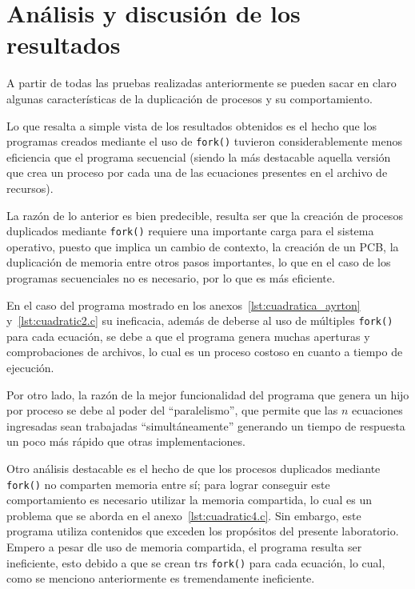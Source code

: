 \section{Análisis y discusión de los resultados}
A partir de todas las pruebas realizadas anteriormente se pueden sacar en claro algunas características de la duplicación de procesos y su comportamiento.

Lo que resalta a simple vista de los resultados obtenidos es el hecho que los programas creados mediante el uso de \verb|fork()| tuvieron considerablemente menos eficiencia que el programa secuencial (siendo la más destacable aquella versión que crea un proceso por cada una de las ecuaciones presentes en el archivo de recursos).

La razón de lo anterior es bien predecible, resulta ser que la creación de procesos duplicados mediante \verb|fork()| requiere una importante carga para el sistema operativo, puesto que implica un cambio de contexto, la creación de un PCB, la duplicación de memoria entre otros pasos importantes, lo que en el caso de los programas secuenciales no es necesario, por lo que es más eficiente.

En el caso del programa mostrado en los anexos~\ref{lst:cuadratica_ayrton} y~\ref{lst:cuadratic2.c} su ineficacia, además de deberse al uso de múltiples \verb|fork()| para cada ecuación, se debe a que el programa genera muchas aperturas y comprobaciones de archivos, lo cual es un proceso costoso en cuanto a tiempo de ejecución.

Por otro lado, la razón de la mejor funcionalidad del programa que genera un hijo por proceso se debe al poder del ``paralelismo'', que permite que las $n$ ecuaciones ingresadas sean trabajadas ``simultáneamente'' generando un tiempo de respuesta un poco más rápido que otras implementaciones.

Otro análisis destacable es el hecho de que los procesos duplicados mediante \verb|fork()| no comparten memoria entre sí; para lograr conseguir este comportamiento es necesario utilizar la memoria compartida, lo cual es un problema que se aborda en el anexo~\ref{lst:cuadratic4.c}. Sin embargo, este programa utiliza contenidos que exceden los propósitos del presente laboratorio. Empero a pesar dle uso de memoria compartida, el programa resulta ser ineficiente, esto debido a que se crean trs \verb|fork()| para cada ecuación, lo cual, como se menciono anteriormente es tremendamente ineficiente.